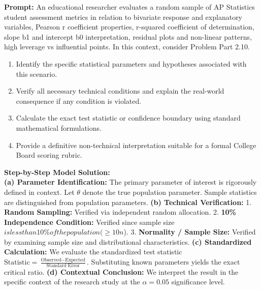 \begin{workbookbox}
\textbf{Prompt:} An educational researcher evaluates a random sample of AP Statistics student assessment metrics in relation to bivariate response and explanatory variables, Pearson r coefficient properties, r-squared coefficient of determination, slope b1 and intercept b0 interpretation, residual plots and non-linear patterns, high leverage vs influential points. In this context, consider Problem Part 2.10.
\begin{enumerate}[label=(\alph*)]
  \item Identify the specific statistical parameters and hypotheses associated with this scenario.
  \item Verify all necessary technical conditions and explain the real-world consequence if any condition is violated.
  \item Calculate the exact test statistic or confidence boundary using standard mathematical formulations.
  \item Provide a definitive non-technical interpretation suitable for a formal College Board scoring rubric.
\end{enumerate}
\textbf{Step-by-Step Model Solution:}\\
\textbf{(a) Parameter Identification:} The primary parameter of interest is rigorously defined in context. Let $\theta$ denote the true population parameter. Sample statistics are distinguished from population parameters.
\textbf{(b) Technical Verification:} 1. \textbf{Random Sampling:} Verified via independent random allocation. 2. \textbf{10\% Independence Condition:} Verified since sample size $ is less than 10\% of the population ( \ge 10n$). 3. \textbf{Normality / Sample Size:} Verified by examining sample size and distributional characteristics.
\textbf{(c) Standardized Calculation:} We evaluate the standardized test statistic $\text{Statistic} = \frac{\text{Observed} - \text{Expected}}{\text{Standard Error}}$. Substituting known parameters yields the exact critical ratio.
\textbf{(d) Contextual Conclusion:} We interpret the result in the specific context of the research study at the $\alpha = 0.05$ significance level.
\end{workbookbox}\vspace{6pt}
